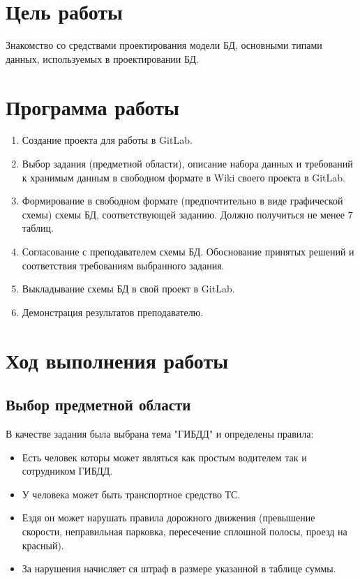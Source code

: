 





\tableofcontents
\newpage



\section{Цель работы}
Знакомство со средствами проектирования модели БД, основными типами данных, используемых в проектировании БД.


\section{Программа работы}
\begin{enumerate}
	\item Создание проекта для работы в GitLab.
	\item Выбор задания (предметной области), описание набора данных и требований к хранимым данным в свободном формате в Wiki своего проекта в GitLab.
	\item Формирование в свободном формате (предпочтительно в виде графической схемы) схемы БД, соответствующей заданию. Должно получиться не менее 7 таблиц.
	\item Согласование с преподавателем схемы БД. Обоснование принятых решений и соответствия требованиям выбранного задания. 
	\item Выкладывание схемы БД в свой проект в GitLab.
	\item Демонстрация результатов преподавателю.
\end{enumerate}


\section{Ход выполнения работы}

\subsection{Выбор предметной области}

В качестве задания была выбрана тема "ГИБДД" и определены правила:

\begin{itemize}
\item Есть человек которы может являться как простым водителем так и сотрудником ГИБДД.
\item У человека может быть транспортное средство ТС.
\item Ездя он может нарушать правила дорожного движения (превышение скорости, неправильная парковка, пересечение сплошной полосы, проезд на красный).
\item За нарушения начисляет ся штраф в размере указанной в таблице суммы.


\end{itemize}


